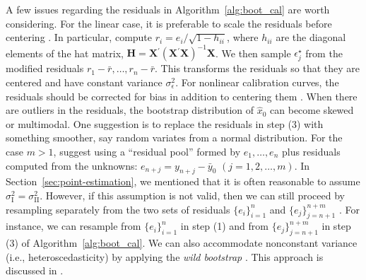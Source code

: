 \documentclass[cmfont,usenames,dvipsnames,leqno]{afit-etd}\usepackage[]{graphicx}\usepackage[]{color}
\newcommand{\boot}{\star} %
\newcommand{\trans}{\ensuremath{^\prime}}
\newcommand{\wh}[1]{\ensuremath{\widehat{#1}}}
\newcommand{\X}{\ensuremath{\bm{X}}}
\begin{document}
A few issues regarding the residuals in Algorithm~\ref{alg:boot_cal} are worth considering. For the linear case, it is preferable to scale the residuals before centering \citep{davison_bootstrap_1997}. In particular, compute $r_i = e_i/\sqrt{1-h_{ii}}$, where $h_{ii}$ are the diagonal elements of the hat matrix, $\bm{H} = \X\trans(\X\trans\X)^{-1}\X$. We then sample $\epsilon_j^\boot$ from the modified residuals $r_1 - \bar{r}, \dotsc, r_n - \bar{r}$. This transforms the residuals so that they are centered and have constant variance $\sigma_\epsilon^2$. For nonlinear calibration curves, the residuals should be corrected for bias in addition to centering them \citep{davison_bootstrap_1997}. When there are outliers in the residuals, the bootstrap distribution of $\wh{x}_0$ can become skewed or multimodal. One suggestion is to replace the residuals in step (3) with something smoother, say random variates from a normal distribution. For the case $m > 1$, \citet{jones_bootstrapping_1999} suggest using a ``residual pool'' formed by $e_1, \dotsc, e_n$ plus residuals computed from the unknowns: $e_{n+j} = y_{n+j} - \bar{y}_0$ $(j = 1, 2, \dotsc, m)$. In Section~\ref{sec:point-estimation}, we mentioned that it is often reasonable to assume $\sigma_{\text{I}}^2 = \sigma_{\text{II}}^2$. However, if this assumption is not valid, then we can still proceed by resampling separately from the two sets of residuals $\big\{e_i\big\}_{i = 1}^n$ and $\big\{e_j\big\}_{j = n + 1}^{n + m}$ \citep{gruet_calibration_1993, jones_bootstrapping_1999}. For instance, we can resample from $\big\{e_i\big\}_{i = 1}^n$ in step (1) and from $\big\{e_j\big\}_{j = n + 1}^{n + m}$ in step (3) of Algorithm~\ref{alg:boot_cal}. We can also accommodate nonconstant variance (i.e., heteroscedasticity) by applying the \textit{wild bootstrap} \citep[pp. 272]{davison_bootstrap_1997}. This approach is discussed in \citet[pp. 142]{huet_statistical_2004}.
\end{document}
